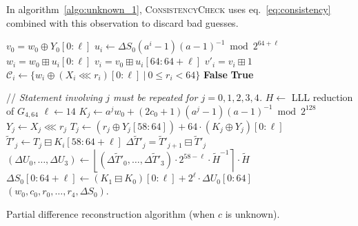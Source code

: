 \documentclass[journal=tosc,final]{iacrtrans}
\begin{document}
In algorithm~\ref{algo:unknown_1}, \textsc{ConsistencyCheck} uses
eq.~\eqref{eq:consistency} combined with this observation to discard bad guesses.



\begin{algorithm}
\begin{algorithmic}[1]
  \State $v_0 = w_0 \oplus Y_0[0:\ell]$ 
  \State $u_i \gets \Delta S_0 (a^i-1)(a-1)^{-1} \bmod 2^{64+\ell}$ 
  \State $w_i = w_0 \boxplus u_i[0:\ell]$ 
  \State $v_i = v_0 \boxplus u_i[64:64+\ell]$ 
  \State $v'_i = v_i \boxplus 1$
  \State $\mathcal{C}_i \gets \{ w_i \oplus (X_i \lll r_i)[0:\ell]~|~ 0\leq r_i < 64\}$ 
  \State \Return \textbf{False} 
  \EndIf
  \EndFor
  \State \Return \textbf{True} 
  \EndProcedure

\State 
  
  \State // \emph{Statement involving $j$ must be repeated for $j=0, 1, 2, 3, 4$.}
  \State $H \gets$ LLL reduction of $G_{4,64}$
  \State $\ell \gets 14$
 
\State $K_j \gets a^j w_0 + (2c_0 + 1)(a^j - 1)(a-1)^{-1} \bmod 2^{128}$ 
   
  \State $Y_j \gets X_j \lll r_j$ 
  \State $T_j \gets \left(r_j \oplus Y_j[58:64]\right) +  64 \cdot \left(K_j \oplus Y_j\right)[0:\ell]$ 
  \State $\widetilde{T}'_j \gets T_j \boxminus  K_i[58:64+\ell]$ 
  \State $\Delta \widetilde{T}'_j = \widetilde{T}'_{j+1} \boxminus \widetilde{T}'_j$  
  \State $(\Delta U_0, \dots, \Delta U_3) \gets \left\lfloor (\Delta \widetilde{T}'_0, \dots, \Delta \widetilde{T}'_3) \cdot 2^{58-\ell} \cdot \widetilde H^{-1} \right\rceil \cdot \widetilde H$ 
  \State $\Delta S_0[0:64+\ell] \gets \left(K_1 \boxminus K_0\right)[0:\ell]
  + 2^{\ell} \cdot \Delta U_0[0:64]$ 
  \State \Return $(w_0, c_0, r_0, \dots, r_4, \Delta S_0)$.
  \EndIf
  \EndFor
  \EndFor
  \EndProcedure
\end{algorithmic}
\caption{Partial difference reconstruction algorithm (when $c$ is unknown).}
\label{algo:unknown_1}
\end{algorithm}
\end{document}
